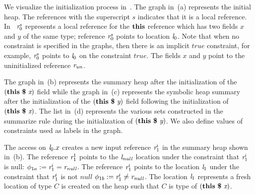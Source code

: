 We visualize the initialization process in~. The
graph in~(a) represents the initial heap. The
references with the superscript $s$ indicates that it is a local
reference. In~ $\emph{r}_0^s$ represents a local
reference for the $\textbf{this}$ reference which has two fields $x$
and $y$ of the same type; reference $\emph{r}_0^s$ points to location
$\emph{l}_0$. Note that when no constraint is specified in the graphs, then
there is an implicit $\mathit{true}$ constraint, for example, $\emph{r}_0^s$
points to $\emph{l}_0$ on the constraint $\mathit{true}$. The fields $x$ and
$y$ point to the uninitialized reference $\emph{r}_\mathit{un}$.


The graph in~(b) represents the summary heap
after the initialization of the $\lp\cfgt{this}\  \cfgt{\$}\ \cfgnt{x}\rp$ field while
the graph in~(c) represents the symbolic heap
summary after the initialization of the $(\textbf{this}\  \textbf{\$}\ \emph{y})$ field
following the initialization of $\lp\cfgt{this}\  \cfgt{\$}\ \cfgnt{x}\rp$. The list
in~(d) represents the various sets constructed in
the summarize rule during the initialization of $(\textbf{this}\  \textbf{\$}\ \emph{y})$. We
also define values of constraints used as labels in the graph.

The access on $\emph{l}_0.x$ creates a new input reference $\emph{r}_1^i$ in the
summary heap shown in~(b). The reference $\emph{r}_1^1$
points to the $\emph{l}_\mathit{null}$ location under the constraint that
$\emph{r}_1^i$ is null: $\phi_{1a} := \emph{r}_1^i = \emph{r}_\mathit{null}$. The reference
$\emph{r}_1^i$ points to the location $\emph{l}_1$ under the constraint that $\emph{r}_1^i$
is not $\mathit{null}$ $\phi_{1b} :=\emph{r}_1^i \neq \emph{r}_\mathit{null}$. The
location $\emph{l}_1$ represents a fresh location of type $C$ is created on
the heap such that $C$ is type of $\lp\cfgt{this}\  \cfgt{\$}\ \cfgnt{x}\rp$.


